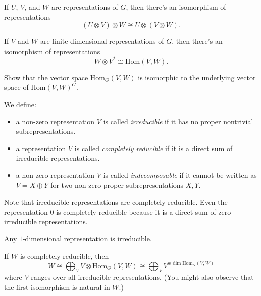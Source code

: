 \documentclass[11pt]{article}
\begin{document}
\begin{exercise}
If $U$, $V$, and $W$ are representations of $G$, then there's an isomorphism of representations
$$(U \otimes V) \otimes W \cong U \otimes (V \otimes W).$$
\end{exercise}

\begin{exercise}
If $V$ and $W$ are finite dimensional representations of $G$, then there's an isomorphism of representations
$$W \otimes V^* \cong \mathrm{Hom}(V,W).$$
\end{exercise}

\begin{exercise}
Show that the vector space $\mathrm{Hom}_G(V,W)$ is isomorphic to the underlying vector space of $\mathrm{Hom}(V,W)^G$. 
\end{exercise}

\begin{definition}  We define:
\begin{itemize}
\item a non-zero representation $V$ is called \emph{irreducible} if it has no proper nontrivial subrepresentations.
\item a representation $V$ is called \emph{completely reducible} if it is a direct sum of irreducible representations.
\item a non-zero representation $V$ is called \emph{indecomposable} if it cannot be written as $V = X \oplus Y$ for two non-zero proper subrepresentations $X, Y$.
\end{itemize}
\end{definition}

\begin{warning}
Note that irreducible representations are completely reducible.  Even the representation $0$ is completely reducible because it is a direct sum of zero irreducible representations.
\end{warning}

\begin{exercise}
Any $1$-dimensional representation is irreducible.
\end{exercise}

\begin{exercise}
If $W$ is completely reducible, then
$$ W \cong \bigoplus_{V} V \otimes \mathrm{Hom}_G(V, W) \cong \bigoplus_{V} V^{\oplus \dim \mathrm{Hom}_G(V, W)} $$
where $V$ ranges over all irreducible representations.
(You might also observe that the first isomorphism is natural in $W$.)
\end{exercise}
\end{document}
